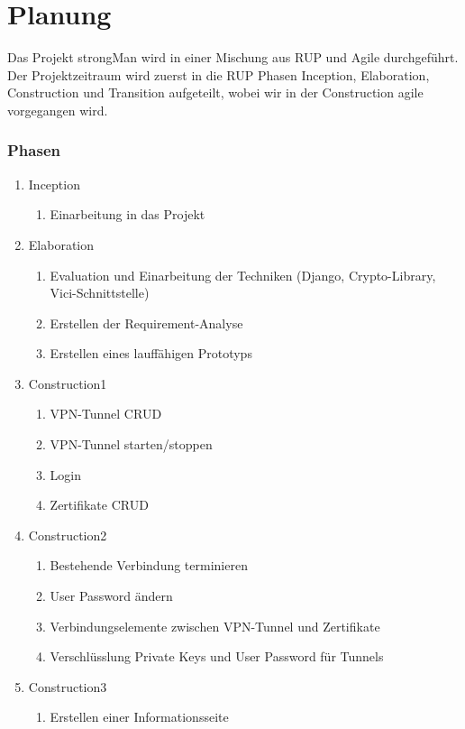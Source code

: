 \section{Planung}
Das Projekt strongMan wird in einer Mischung aus \Gls{RUP} und Agile durchgeführt. Der Projektzeitraum wird zuerst in die RUP Phasen Inception, Elaboration, Construction und Transition aufgeteilt, wobei wir in der Construction agile vorgegangen wird.

\subsubsection{Phasen}
\begin{enumerate}
  \item Inception
  \begin{enumerate}
    \item Einarbeitung in das Projekt
  \end{enumerate}
  \item Elaboration
  \begin{enumerate}
    \item Evaluation und Einarbeitung der Techniken (Django, Crypto-Library, Vici-Schnittstelle)
    \item Erstellen der Requirement-Analyse
    \item Erstellen eines lauffähigen Prototyps
  \end{enumerate}
  \item Construction1
  \begin{enumerate}
    \item VPN-Tunnel CRUD
    \item VPN-Tunnel starten/stoppen
    \item Login 
    \item Zertifikate CRUD
  \end{enumerate}
  \item Construction2
  \begin{enumerate}
    \item Bestehende Verbindung terminieren
    \item User Password ändern 
    \item Verbindungselemente zwischen VPN-Tunnel und Zertifikate
    \item Verschlüsslung Private Keys und User Password für Tunnels
  \end{enumerate}
    \item Construction3
  \begin{enumerate}
  	\item Erstellen einer Informationsseite

\end{enumerate}
\end{enumerate}
